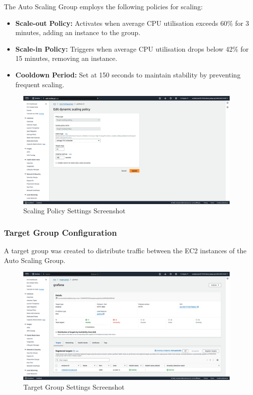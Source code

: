 \documentclass[12pt,oneside]{book} %
\begin{document}
The Auto Scaling Group employs the following policies for scaling:
\begin{itemize}
    \item \textbf{Scale-out Policy:} Activates when average CPU utilisation exceeds 60\% for 3 minutes, adding an instance to the group.
    \item \textbf{Scale-in Policy:} Triggers when average CPU utilisation drops below 42\% for 15 minutes, removing an instance.
    \item \textbf{Cooldown Period:} Set at 150 seconds to maintain stability by preventing frequent scaling.
\end{itemize}

\begin{figure}[H]
    \centering
    \includegraphics[width=1\linewidth]{images/scaling-policy.png}
    \caption{Scaling Policy Settings Screenshot}\label{fig:scaling-policy-settings}
\end{figure}

\subsubsection{Target Group Configuration}

A target group was created to distribute traffic between the EC2 instances of
the Auto Scaling Group.

\begin{figure}[H]
    \centering
    \includegraphics[width=1\linewidth]{images/target-group.png}
    \caption{Target Group Settings Screenshot}\label{fig:target-group-settings}
\end{figure}
\end{document}
